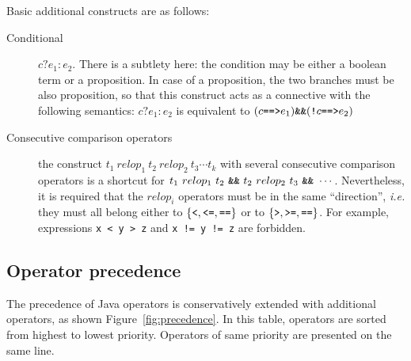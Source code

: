 \documentclass[a4paper,11pt,twoside,openright]{report}
\begin{document}
Basic additional constructs are as follows:
\begin{description}

\item[Conditional] $c ? e_1 : e_2$. There is a subtlety
  here: the condition may be either a boolean term or a proposition.  In
  case of a proposition, the two branches must be also proposition, so
  that this construct acts as a connective with the following
  semantics: $ c ? e_1 : e_2$ is equivalent to $(c
  \verb|==>| e_1) \verb|&&| (\verb|!| c \verb|==>| e_2)$


\item[Consecutive comparison operators] the construct $t_1~relop_1~t_2~relop_2~t_3 \cdots t_k$ with
  several consecutive comparison operators is a shortcut for
  $t_1~relop_1~t_2 ~\verb|&&|~ t_2~relop_2~t_3 ~\verb|&&|~ \cdots $.
  Nevertheless, it is required that the $relop_i$ operators must be in
  the same ``direction'', \emph{i.e.} they must all belong either to
  $\{\verb|<|, \verb|<=|, \verb|==|\}$ or to
  $\{\verb|>|,\verb|>=|,\verb|==|\}$. For example, expressions
  \verb|x < y > z| and \verb|x != y != z| are forbidden.

\end{description}

\subsection{Operator precedence}

The precedence of Java operators is conservatively extended with
additional operators, as shown Figure~\ref{fig:precedence}. In this
table, operators are sorted from highest to lowest priority. Operators
of same priority are presented on the same line.
\end{document}
